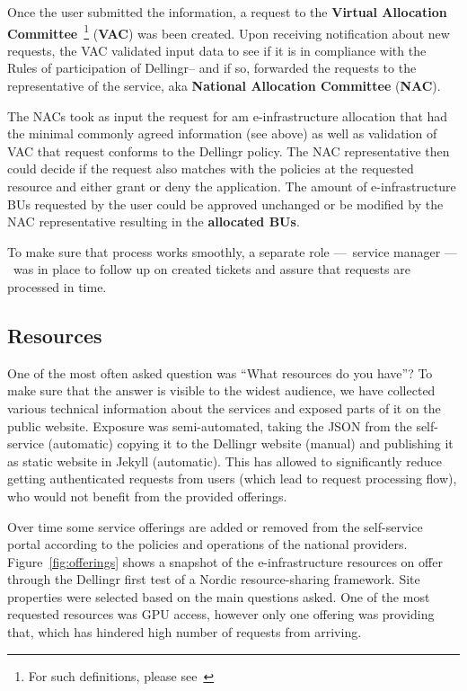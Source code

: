 \documentclass{article}
\newcommand{\dell}{Dellingr\xspace}
\newcommand{\einfra}{e-infrastructure\xspace}
\newcommand{\np}{national provider\xspace}
\newcommand{\nps}{\np{s}\xspace}
\newcommand{\pilot}{first test of a Nordic resource-sharing framework\xspace}
\begin{document}
Once the user submitted the information, a request to the \textbf{Virtual Allocation Committee}~\footnote{For such definitions, please see~\cite{dellingr-p2-do5}} (\textbf{VAC}) was been created. 
Upon receiving notification about new requests, the VAC validated input data to see if it is in compliance
with the Rules of participation of \dell -- and if so, forwarded the requests to the representative of the service,
aka \textbf{National Allocation Committee} (\textbf{NAC}).

The NACs took as input the request for am \einfra allocation that had the minimal commonly agreed information (see above) as well as validation of VAC that request conforms to the \dell policy. 
The NAC representative then could decide if the request also matches with
the policies at the requested resource and either grant or deny the application.
The amount of \einfra BUs requested by the user could be approved unchanged or be modified by the NAC representative resulting in the {\bf allocated BUs}.

To make sure that process works smoothly, a separate role –– service manager –– was in place to follow up on created tickets and assure that requests are processed in time.

\subsection{Resources}

One of the most often asked question was ``What resources do you have''?
To make sure that the answer is visible to the widest audience, we have collected various
technical information about the services and exposed parts of it on the public website.
Exposure was semi-automated, taking the JSON from the self-service (automatic) copying it to
the \dell website (manual) and publishing it as static website in Jekyll (automatic).
This has allowed to significantly reduce getting authenticated requests from users (which lead to request processing flow), who would not benefit from the provided offerings.  

Over time some service offerings are added or removed from the self-service portal according to the
policies and operations of the \nps.
Figure~\ref{fig:offerings} shows a snapshot of the \einfra resources on offer through the \dell \pilot.
Site properties were selected based on the main questions asked. 
One of the most requested resources was GPU access, however only one offering was providing that,
which has hindered high number of requests from arriving.
\end{document}
